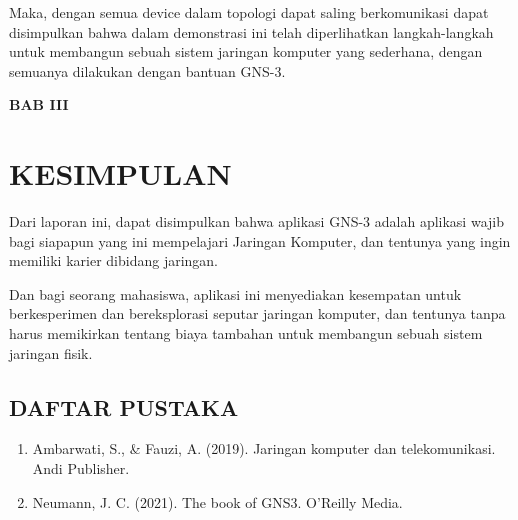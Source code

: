 \documentclass[12pt, a4paper]{article}
\begin{document}
      Maka, dengan semua device dalam topologi dapat saling berkomunikasi dapat
      disimpulkan bahwa dalam demonstrasi ini telah diperlihatkan langkah-langkah
      untuk membangun sebuah sistem jaringan komputer yang sederhana, dengan
      semuanya dilakukan dengan bantuan GNS-3.

  \newpage

  \begin{center}
    \large{\textbf{BAB III}}

    \section*{KESIMPULAN}
  \end{center}

  \vspace{1cm}

  Dari laporan ini, dapat disimpulkan bahwa aplikasi GNS-3 adalah aplikasi wajib
  bagi siapapun yang ini mempelajari Jaringan Komputer, dan tentunya yang ingin
  memiliki karier dibidang jaringan.

  Dan bagi seorang mahasiswa, aplikasi ini menyediakan kesempatan untuk berkesperimen
  dan bereksplorasi seputar jaringan komputer, dan tentunya tanpa harus memikirkan
  tentang biaya tambahan untuk membangun sebuah sistem jaringan fisik.

  \newpage

  \begin{center}
    \section*{DAFTAR PUSTAKA}
  \end{center}
  \vspace{1cm}

\begin{enumerate}
  \item Ambarwati, S., \& Fauzi, A. (2019). Jaringan komputer dan telekomunikasi. Andi Publisher.
  \item Neumann, J. C. (2021). The book of GNS3. O'Reilly Media.
\end{enumerate}
\end{document}
